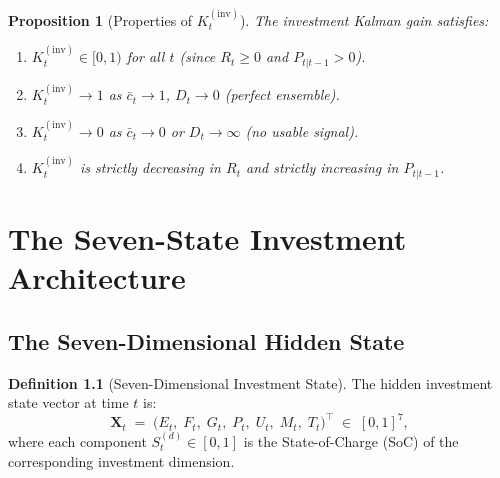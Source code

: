 \documentclass[12pt,openany]{book}
\newcommand{\calE}{\mathcal{E}}
\newcommand{\calF}{\mathcal{F}}
\newcommand{\calG}{\mathcal{G}}
\newcommand{\calP}{\mathcal{P}}
\newcommand{\calU}{\mathcal{U}}
\newcommand{\calM}{\mathcal{M}}
\newcommand{\calT}{\mathcal{T}}
\numberwithin{equation}{chapter}
\theoremstyle{plain}
\newtheorem{proposition}[theorem]{Proposition}
\theoremstyle{definition}
\newtheorem{definition}[theorem]{Definition}
\theoremstyle{remark}
\def\mathcal#1{#1}%
\def\calE{E}%
\def\calF{F}%
\def\calG{G}%
\def\calP{P}%
\def\calU{U}%
\def\calM{M}%
\def\calT{T}%
\begin{document}
\begin{proposition}[Properties of $K_t^{(\mathrm{inv})}$]
\label{prop:gain-properties}
The investment Kalman gain satisfies:
\begin{enumerate}
  \item $K_t^{(\mathrm{inv})} \in [0,1)$ for all $t$ (since $R_t \geq 0$
        and $P_{t|t-1} > 0$).
  \item $K_t^{(\mathrm{inv})} \to 1$ as $\bar{c}_t \to 1$, $D_t \to 0$
        (perfect ensemble).
  \item $K_t^{(\mathrm{inv})} \to 0$ as $\bar{c}_t \to 0$ or $D_t \to \infty$
        (no usable signal).
  \item $K_t^{(\mathrm{inv})}$ is strictly decreasing in $R_t$ and strictly
        increasing in $P_{t|t-1}$.
\end{enumerate}
\end{proposition}

\chapter{The Seven-State Investment Architecture}
\label{ch:states}

\section{The Seven-Dimensional Hidden State}

\begin{definition}[Seven-Dimensional Investment State]
\label{def:hidden-state}
The hidden investment state vector at time $t$ is:
\begin{equation}
  \mathbf{X}_t \;=\;
  \bigl(\calE_t,\;\calF_t,\;\calG_t,\;\calP_t,\;
         \calU_t,\;\calM_t,\;\calT_t\bigr)^\top
  \;\in\; [0,1]^7,
  \label{eq:hidden-state}
\end{equation}
where each component $\mathcal{S}_t^{(d)} \in [0,1]$ is the
State-of-Charge (SoC) of the corresponding investment dimension.
\end{definition}
\end{document}
